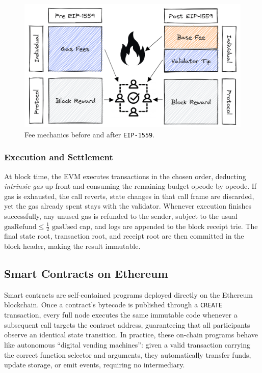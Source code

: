 \begin{figure}[h]
  \centering
  \includegraphics[width=.85\linewidth]{Images/Chap1/eip1559.png}
  \caption{Fee mechanics before and after \texttt{EIP-1559}.\cite{londonFork}}
  \label{fig:tx_flow}
\end{figure}

\subsubsection{Execution and Settlement}
At block time, the EVM executes transactions in the chosen order, deducting \textit{intrinsic gas} up-front and consuming the remaining budget opcode by opcode. If gas is exhausted, the call reverts, state changes in that call frame are discarded, yet the gas already spent stays with the validator.  Whenever execution finishes successfully, any unused gas is refunded to the sender, subject to the usual \(\text{gasRefund}\le\frac12\text{ gasUsed}\) cap, and logs are appended to the block receipt trie. The final state root, transaction root, and receipt root are then committed in the block header, making the result immutable.

\subsection{Smart Contracts on Ethereum}\label{subsec:smart_contracts}

Smart contracts are self-contained programs deployed directly on the Ethereum blockchain. Once a contract’s bytecode is published through a \texttt{CREATE} transaction, every full node executes the same immutable code whenever a subsequent call targets the contract address, guaranteeing that all participants observe an identical state transition. In practice, these on-chain programs behave like autonomous “digital vending machines”: given a valid transaction carrying the correct function selector and arguments, they automatically transfer funds, update storage, or emit events, requiring no intermediary.

